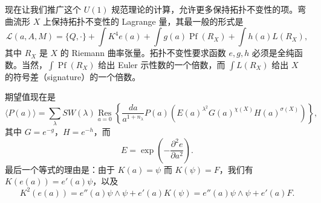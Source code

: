 
现在让我们推广这个 $U(1)$ 规范理论的计算，允许更多保持拓扑不变性的项。弯曲流形 $X$ 上保持拓扑不变性的 Lagrange 量，其最一般的形式是
\[
\mathcal{L}(a,A,M)=\{Q,\cdot\}+\int K^4e(a)+\int g(a)\operatorname{Pf}(R_X)+\int h(a)L(R_X),
\]
其中 $R_X$ 是 $X$ 的 Riemann 曲率张量。拓扑不变性要求函数 $e,g,h$ 必须是全纯函数。当然，$\int\operatorname{Pf}(R_X)$ 给出 Euler 示性数的一个倍数，而 $\int L(R_X)$ 给出 $X$ 的符号差（signature）的一个倍数。


期望值现在是
\[
\langle P(a)\rangle=\sum_\lambda SW(\lambda)\operatorname*{Res}_{a=0}
\left\{\frac{da}{a^{1+n_\lambda}}P(a)\left(E(a)^{\lambda^2}G(a)^{\chi(X)}H(a)^{\sigma(X)}\right)\right\},
\]
其中 $G=e^{-g}$，$H=e^{-h}$，而
\[
E=\exp\left(-\frac{\partial^2e}{\partial a^2}\right).
\]
最后一个等式的理由是：由于 $K(a)=\psi$ 而 $K(\psi)=F$，我们有 $K(e(a))=e'(a)\psi$，以及
\[
K^2(e(a))=e''(a)\psi\wedge\psi+e'(a)K(\psi)=e''(a)\psi\wedge\psi+e'(a)F.
\]


